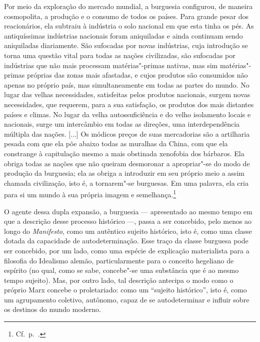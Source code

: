 \begin{hedraquote} 
Por meio da exploração do mercado mundial, a burguesia configurou, de
maneira cosmopolita, a produção e o consumo de todos os países. Para
grande pesar dos reacionários, ela subtraiu à indústria o solo nacional
em que esta tinha os pés. As antiquíssimas indústrias nacionais foram
aniquiladas e ainda continuam sendo aniquiladas diariamente. São
sufocadas por novas indústrias, cuja introdução se torna uma questão
vital para todas as nações civilizadas, são sufocadas por indústrias que não mais
processam matérias"-primas nativas, mas sim matérias"-primas próprias
das zonas mais afastadas, e cujos produtos são consumidos não apenas no
próprio país, mas simultaneamente em todas as partes do mundo. No lugar
das velhas necessidades, satisfeitas pelos produtos nacionais, surgem
novas necessidades, que requerem, para a sua satisfação, os produtos dos
mais distantes países e climas. No lugar da velha autossuficiência e
do velho isolamento locais e nacionais, surge um intercâmbio em
todas as direções, uma interdependência múltipla das nações. [...] Os
módicos preços de suas mercadorias são a artilharia pesada com que ela
põe abaixo todas as muralhas da China, com que ela constrange à
capitulação mesmo a mais obstinada xenofobia dos bárbaros. Ela obriga
todas as nações que não queiram desmoronar a apropriar"-se do modo de
produção da burguesia; ela as obriga a introduzir em seu próprio meio a
assim chamada civilização, isto é, a tornarem"-se burguesas. Em uma
palavra, ela cria para si um mundo à sua própria imagem e semelhança.\footnote{ Cf.~p.~\pageref{5}.}
\end{hedraquote} 

O agente dessa dupla expansão, a burguesia --- apresentado ao mesmo tempo
em que a descrição desse processo histórico ---, passa a ser concebido,
pelo menos ao longo do \textit{Manifesto}, como um autêntico sujeito
histórico, isto é, como uma classe dotada da capacidade de
autodeterminação. Esse traço da classe burguesa pode ser concebido, por
um lado, como uma espécie de explicação materialista para a filosofia
do Idealismo alemão, particularmente para o conceito hegeliano de
espírito (no qual, como se sabe, concebe"-se uma substância que é ao
mesmo tempo sujeito). Mas, por outro lado, tal descrição antecipa o
modo como o próprio Marx concebe o proletariado: como um “sujeito
histórico”, isto é, como um agrupamento coletivo, autônomo, capaz de se
autodeterminar e influir sobre os destinos do mundo moderno.

